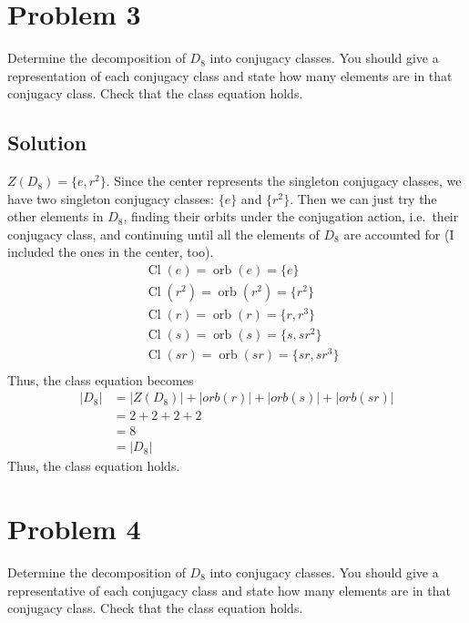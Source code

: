 \documentclass[fleqn]{article}
\DeclareMathOperator{\orb}{orb}
\DeclareMathOperator{\Cl}{Cl}
\begin{document}
    \section{Problem 3}
    Determine the decomposition of $D_8$ into conjugacy classes.  You should give a representation of each conjugacy class and state how many elements are in that conjugacy class.  Check that the class equation holds.
        
        \subsection{Solution}
        $Z(D_8) = \{e, r^2\}$.  Since the center represents the singleton conjugacy classes, we have two singleton conjugacy classes: $\{e\}$ and $\{r^2\}$.  Then we can just try the other elements in $D_8$, finding their orbits under the conjugation action, i.e.\ their conjugacy class, and continuing until all the elements of $D_8$ are accounted for (I included the ones in the center, too).
        \begin{align}
            &\Cl(e)   = \orb(e)   = \{e\} \\
            &\Cl(r^2) = \orb(r^2) = \{r^2\} \\
            &\Cl(r)   = \orb(r)   = \{r, r^3\} \\
            &\Cl(s)   = \orb(s)   = \{s, sr^2\} \\
            &\Cl(sr)  = \orb(sr)  = \{sr, sr^3\} \\
        \end{align}
        Thus, the class equation becomes
        \begin{align}
            |D_8| &= |Z(D_8)| + |orb(r)| + |orb(s)| + |orb(sr)| \\
                &= 2 + 2 + 2 + 2 \\
                &= 8 \\
                &= |D_8|
        \end{align}
        Thus, the class equation holds.
    
    \pagebreak
    
    \section{Problem 4}
    Determine the decomposition of $D_8$ into conjugacy classes.  You should give a representative of each conjugacy class and state how many elements are in that conjugacy class.  Check that the class equation holds.
        
\end{document}
